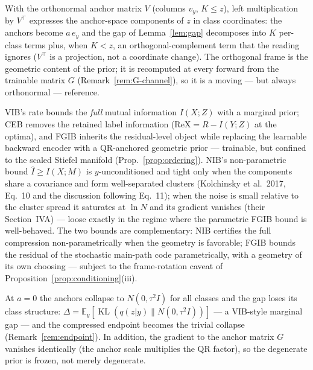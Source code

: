 \begin{remark}\label{rem:frame}
With the orthonormal anchor matrix $V$ (columns $v_y$, $K \le z$), left multiplication
by $V^{\top}$ expresses the anchor-space components of $z$ in class coordinates: the
anchors become $a\,e_y$ and the gap of Lemma~\ref{lem:gap} decomposes into $K$
per-class terms plus, when $K < z$, an orthogonal-complement term that the reading
ignores ($V^{\top}$ is a projection, not a coordinate change). The orthogonal frame is
the geometric content of the prior; it is recomputed at every forward from the
trainable matrix $G$ (Remark~\ref{rem:G-channel}), so it is a moving --- but always
orthonormal --- reference.
\end{remark}

\begin{remark}\label{rem:position}
VIB's rate bounds the \emph{full} mutual information $I(X;Z)$ with a marginal prior;
CEB removes the retained label information ($\mathrm{ReX} = R - I(Y;Z)$ at the optima),
and FGIB inherits the residual-level object while replacing the learnable backward
encoder with a QR-anchored geometric prior --- trainable, but confined to the scaled
Stiefel manifold (Prop.~\ref{prop:ordering}).
NIB's non-parametric bound $\widehat I \ge I(X;M)$ is $y$-unconditioned and tight only
when the components share a covariance and form well-separated clusters (Kolchinsky et
al.\ 2017, Eq.~10 and the discussion following Eq.~11); when the noise is small relative
to the cluster spread it saturates at $\ln N$ and its gradient vanishes (their
Section~IVA) --- loose exactly in the regime where the parametric FGIB bound is
well-behaved. The two bounds are complementary: NIB certifies the full compression
non-parametrically when the geometry is favorable; FGIB bounds the residual of the stochastic main-path code
parametrically, with a geometry of its own choosing --- subject to the frame-rotation
caveat of Proposition~\ref{prop:conditioning}(iii).
\end{remark}

\begin{remark}\label{rem:a0}
At $a = 0$ the anchors collapse to $N(0, \tau^2 I)$ for all classes and the gap loses its
class
structure: $\Delta = \mathbb{E}_y[\operatorname{KL}(q(z|y)\|N(0,\tau^2 I))]$ --- a
VIB-style
marginal gap --- and the compressed endpoint becomes the trivial collapse
(Remark~\ref{rem:endpoint}). In addition, the gradient to the anchor matrix $G$
vanishes identically (the anchor scale multiplies the QR factor), so the degenerate
prior is frozen, not merely degenerate.
\end{remark}

